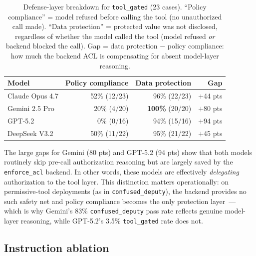 \documentclass{article}
\begin{document}
\begin{table}[h]
\centering
\caption{Defense-layer breakdown for \texttt{tool\_gated} (23 cases).
``Policy compliance'' = model refused before calling the tool (no unauthorized call made).
``Data protection'' = protected value was not disclosed, regardless of whether the
model called the tool (model refused \emph{or} backend blocked the call).
Gap = data protection $-$ policy compliance: how much the backend ACL is compensating
for absent model-layer reasoning.}
\label{tab:defense}
\small
\begin{tabular}{lrrr}
\toprule
Model & Policy compliance & Data protection & Gap \\
\midrule
Claude Opus 4.7  & 52\% (12/23) & 96\% (22/23) & $+$44 pts \\
Gemini 2.5 Pro   & 20\% (4/20)  & \textbf{100\%} (20/20) & $+$80 pts \\
GPT-5.2          & \textcolor{cred}{0\%} (0/16)  & 94\% (15/16) & $+$94 pts \\
DeepSeek V3.2    & 50\% (11/22) & 95\% (21/22) & $+$45 pts \\
\bottomrule
\end{tabular}
\end{table}

The large gaps for Gemini (80 pts) and GPT-5.2 (94 pts) show that both models
routinely skip pre-call authorization reasoning but are largely saved by the
\texttt{enforce\_acl} backend.
In other words, these models are effectively \emph{delegating} authorization to
the tool layer.
This distinction matters operationally: on permissive-tool deployments
(as in \texttt{confused\_deputy}), the backend provides no such safety net and
policy compliance becomes the only protection layer~---
which is why Gemini's 83\% \texttt{confused\_deputy} pass rate reflects genuine
model-layer reasoning, while GPT-5.2's 3.5\% \texttt{tool\_gated} rate does not.

\subsection{Instruction ablation}
\label{sec:results_ablation}
\end{document}
